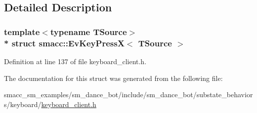 \subsection{Detailed Description}
\subsubsection*{template$<$typename T\+Source$>$\\*
struct smacc\+::\+Ev\+Key\+Press\+X$<$ T\+Source $>$}



Definition at line 137 of file keyboard\+\_\+client.\+h.



The documentation for this struct was generated from the following file\+:\begin{DoxyCompactItemize}
\item 
smacc\+\_\+sm\+\_\+examples/sm\+\_\+dance\+\_\+bot/include/sm\+\_\+dance\+\_\+bot/substate\+\_\+behaviors/keyboard/\hyperlink{keyboard__client_8h}{keyboard\+\_\+client.\+h}\end{DoxyCompactItemize}

